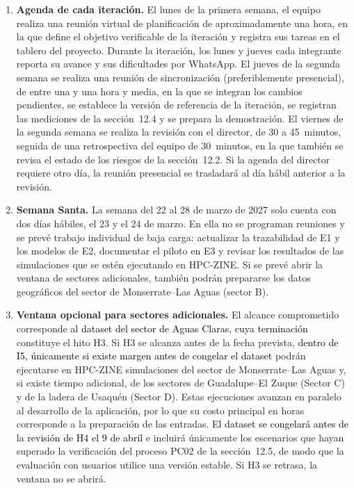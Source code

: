 \begin{enumerate}
    \item \textbf{Agenda de cada iteración.} El lunes de la primera semana, el equipo realiza una reunión virtual de planificación de aproximadamente una hora, en la que define el objetivo verificable de la iteración y registra sus tareas en el tablero del proyecto. Durante la iteración, los lunes y jueves cada integrante reporta su avance y sus dificultades por WhatsApp. El jueves de la segunda semana se realiza una reunión de sincronización (preferiblemente presencial), de entre una y una hora y media, en la que se integran los cambios pendientes, se establece la versión de referencia de la iteración, se registran las mediciones de la sección~12.4 y se prepara la demostración. El viernes de la segunda semana se realiza la revisión con el director, de 30 a 45~minutos, seguida de una retrospectiva del equipo de 30~minutos, en la que también se revisa el estado de los riesgos de la sección~12.2. Si la agenda del director requiere otro día, la reunión presencial se trasladará al día hábil anterior a la revisión.
    \item \textbf{Semana Santa.} La semana del 22 al 28 de marzo de 2027 solo cuenta con dos días hábiles, el 23 y el 24 de marzo. En ella no se programan reuniones y se prevé trabajo individual de baja carga: actualizar la trazabilidad de E1 y los modelos de E2, documentar el piloto en E3 y revisar los resultados de las simulaciones que se estén ejecutando en HPC-ZINE. Si se prevé abrir la ventana de sectores adicionales, también podrán prepararse los datos geográficos del sector de Monserrate--Las Aguas (sector B).
    \item \textbf{Ventana opcional para sectores adicionales.} El alcance comprometido corresponde \textcolor{black}{al dataset del sector de Aguas Claras, cuya terminación} constituye el hito H3. Si H3 se alcanza antes de la fecha prevista, \textcolor{black}{dentro de I5, únicamente si existe margen antes de congelar \textcolor{black}{el dataset}} podrán ejecutarse en HPC-ZINE simulaciones del sector de Monserrate--Las Aguas y, si existe tiempo adicional, de los sectores de Guadalupe--El Zuque (Sector C) y de la ladera de Usaquén (Sector D). Estas ejecuciones avanzan en paralelo al desarrollo de la aplicación, por lo que su costo principal en horas corresponde a la preparación de las entradas. \textcolor{black}{El dataset se congelará} \textcolor{black}{antes de la revisión de H4 el 9 de abril} e incluirá únicamente los escenarios que hayan superado la verificación del proceso PC02 de la sección~12.5, de modo que la evaluación con usuarios utilice una versión estable. Si H3 se retrasa, la ventana no se abrirá.
\end{enumerate}


